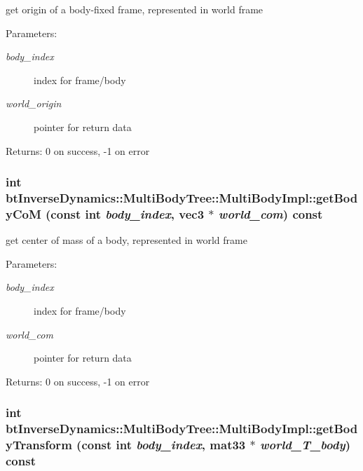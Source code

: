 get origin of a body-fixed frame, represented in world frame \begin{Desc}
\item[Parameters:]
\begin{description}
\item[{\em body\_\-index}]index for frame/body \item[{\em world\_\-origin}]pointer for return data \end{description}
\end{Desc}
\begin{Desc}
\item[Returns:]0 on success, -1 on error \end{Desc}
 \hypertarget{classbt_inverse_dynamics_1_1_multi_body_tree_1_1_multi_body_impl_7787b44956c65fc638368273382070df}{
\subsubsection[getBodyCoM]{\setlength{\rightskip}{0pt plus 5cm}int btInverseDynamics::MultiBodyTree::MultiBodyImpl::getBodyCoM (const int {\em body\_\-index}, \/  {\bf vec3} $\ast$ {\em world\_\-com}) const}}
\label{classbt_inverse_dynamics_1_1_multi_body_tree_1_1_multi_body_impl_7787b44956c65fc638368273382070df}


get center of mass of a body, represented in world frame \begin{Desc}
\item[Parameters:]
\begin{description}
\item[{\em body\_\-index}]index for frame/body \item[{\em world\_\-com}]pointer for return data \end{description}
\end{Desc}
\begin{Desc}
\item[Returns:]0 on success, -1 on error \end{Desc}
 \hypertarget{classbt_inverse_dynamics_1_1_multi_body_tree_1_1_multi_body_impl_2ed9b926162aaf1eacf4f85190b014c7}{
\subsubsection[getBodyTransform]{\setlength{\rightskip}{0pt plus 5cm}int btInverseDynamics::MultiBodyTree::MultiBodyImpl::getBodyTransform (const int {\em body\_\-index}, \/  mat33 $\ast$ {\em world\_\-T\_\-body}) const}}
\label{classbt_inverse_dynamics_1_1_multi_body_tree_1_1_multi_body_impl_2ed9b926162aaf1eacf4f85190b014c7}


